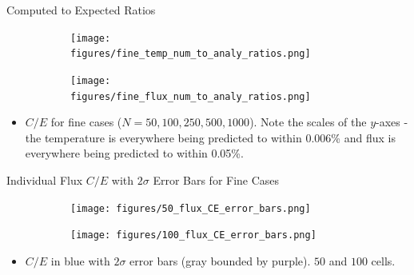 \documentclass[9pt,t]{beamer}
\begin{document}
\begin{frame}{Computed to Expected Ratios}
    \vspace*{-0.4cm}
    \begin{figure}[T]
        \hspace*{-0.87cm}
        \begin{subfigure}{0.495\linewidth}
            \texttt{[image: figures/fine\_temp\_num\_to\_analy\_ratios.png]}
        \end{subfigure}\hspace*{0.85cm}
        \begin{subfigure}{0.495\linewidth}
            \texttt{[image: figures/fine\_flux\_num\_to\_analy\_ratios.png]}
        \end{subfigure}
    \end{figure}
    \begin{itemize}
        \item $C/E$ for fine cases ($N=50,100,250,500,1000$). Note the scales of the $y$-axes - the temperature is everywhere being predicted to within 0.006\% and flux is everywhere being predicted to within 0.05\%.
    \end{itemize}
\end{frame}

\begin{frame}{Individual Flux $C/E$ with $2\sigma$ Error Bars for Fine Cases}
    \begin{figure}[T]
        \hspace*{-1.1cm}
        \begin{subfigure}{0.495\textwidth}
            \texttt{[image: figures/50\_flux\_CE\_error\_bars.png]}
        \end{subfigure}\hspace*{0.89cm}
        \begin{subfigure}{0.495\textwidth}
            \texttt{[image: figures/100\_flux\_CE\_error\_bars.png]}
        \end{subfigure}
    \end{figure}
    \begin{itemize}
        \item $C/E$ in blue with $2\sigma$ error bars (gray bounded by purple). $50$ and $100$ cells.
    \end{itemize}
\end{frame}
\end{document}
